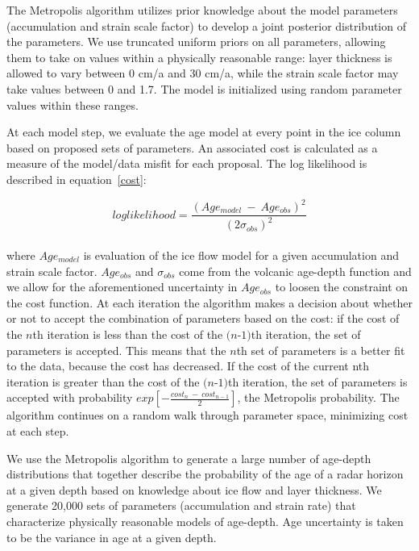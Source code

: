\documentclass[12pt]{article}
\begin{document}
The Metropolis algorithm utilizes prior knowledge about the model parameters (accumulation and strain scale factor) to develop a joint posterior distribution of the parameters. We use truncated uniform priors on all parameters, allowing them to take on values within a physically reasonable range: layer thickness is allowed to vary between 0 cm/a and 30 cm/a, while the strain scale factor may take values between 0 and 1.7.  The model is initialized using random parameter values within these ranges.

At each model step, we evaluate the age model at every point in the ice column based on proposed sets of parameters.  An associated cost is calculated as a measure of the model/data misfit for each proposal. The log likelihood is described in equation~\ref{cost}:

\begin{equation}\label{cost}
log likelihood = \frac{(Age_{model}~ - ~Age_{obs})^2}{(2\sigma_{obs})^2}
\end{equation}
\\

where $Age_{model}$ is evaluation of the \citet{morland09} ice flow model for a given accumulation and strain scale factor. $Age_{obs}$ and $\sigma_{obs}$ come from the volcanic age-depth function and we allow for the aforementioned uncertainty in $Age_{obs}$ to loosen the constraint on the cost function. At each iteration the algorithm makes a decision about whether or not to accept the combination of parameters based on the cost: if the cost of the $\textit{n}$th iteration is less than the cost of the $\textit{(n-1)}$th iteration, the set of parameters is accepted. This means that the $\textit{n}$th set of parameters is a better fit to the data, because the cost has decreased. If the cost of the current nth iteration is greater than the cost of the $\textit{(n-1)}$th iteration, the set of parameters is accepted with probability $exp[-\frac{cost_n~-~cost_{n-1}}{2}]$, the Metropolis probability. The algorithm continues on a random walk through parameter space, minimizing cost at each step.

We use the Metropolis algorithm to generate a large number of age-depth distributions that together describe the probability of the age of a radar horizon at a given depth based on knowledge about ice flow and layer thickness. We generate 20,000 sets of parameters (accumulation and strain rate) that characterize physically reasonable models of age-depth. Age uncertainty is taken to be the variance in age at a given depth. 
\end{document}
